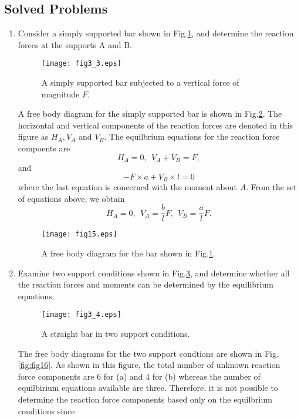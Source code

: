 \documentclass[10pt,a4j]{article}
\begin{document}
\subsection{Solved Problems}
\begin{enumerate}
\item
Consider a simply supported bar shown in Fig.\ref{fig:fig3_3}, and 
determine the reaction forces at the supports A and B.
\begin{figure}[h]
	\begin{center}
	\texttt{[image: fig3\_3.eps]} 
	\end{center}
	\caption{A simply supported bar subjected to a vertical force of magnitude $F$.}
	\label{fig:fig3_3}
\end{figure}
{\small
	A free body diagram for the simply supported bar is shown in Fig.\ref{fig:fig15}. 
	The horizontal and vertical components of the reaction forces are denoted in
	this figure as $H_A, V_A$ and $V_B$.
	The equilbrium equations for the reaction force compoents are 
	\[
		H_A=0, \ \ V_A+V_B=F, 
	\]
	and 
	\[
		-F\times a +V_B\times l =0
	\]
	where the last equation is concerned with the moment about $A$.
	From the set of equations above, we obtain
	\[
		H_A=0, \ \ V_A=\frac{b}{l}F, \ \ V_B=\frac{a}{l}F.
	\]
}
	\begin{figure}[h]
	\begin{center}
	\texttt{[image: fig15.eps]} 
	\end{center}
	\caption{A free body diagram for the bar shown in Fig.\ref{fig:fig3_3}.} 
	\label{fig:fig15}
	\end{figure}
\item
Examine two support conditions shown in Fig.\ref{fig:fig3_4}, 
and determine whether all the reaction forces and moments can 
be determined by the equilibrium equations. 
\begin{figure}[h]
	\begin{center}
	\texttt{[image: fig3\_4.eps]} 
	\end{center}
	\caption{A straight bar in two support conditions.} 
	\label{fig:fig3_4}
\end{figure}
{\small
	The free body diagrams for the two support condtions are shown in Fig.\ref{fig:fig16}. 
	As shown in this figure, the total number of unknown reaction force components are  
	6 for (a) and 4 for (b) whereas the number of equilbirium equations 
	available are three. Therefore, it is not possible to determine the 
	reaction force components based only on the equilbrium conditions since 
}
\end{enumerate}
\end{document}
